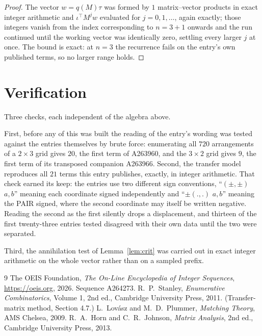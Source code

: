 \documentclass[11pt,a4paper]{article}
\theoremstyle{plain}
\theoremstyle{definition}
\begin{document}
\begin{proof}
The vector $w=q(M)\tau$ was formed by $1$ matrix--vector products in exact integer
arithmetic and $\iota^{\!\top}M^{j}w$ evaluated for $j=0,1,\dots$, again exactly; those
integers vanish from the index corresponding to $n=3+1$ onwards and the run continued
until the working vector was identically zero, settling every larger $j$ at once. The bound is exact: at $n=3$ the recurrence fails on the entry's own published terms, so no larger range holds.
\end{proof}

\section{Verification}

Three checks, each independent of the algebra above.

First, before any of this was built the reading of the entry's wording was tested against the
entries themselves by brute force: enumerating all $720$ arrangements of a $2\times3$ grid
gives $20$, the first term of A263960, and the $3\times2$ grid gives $9$, the first term of its
transposed companion A263966. Second, the transfer model reproduces all $21$ terms this
entry publishes, exactly, in integer arithmetic. That check earned its keep: the entries use
two different sign conventions, ``$(\pm,\pm)$ $a,b$'' meaning each coordinate signed
independently and ``$\pm(.,.)$ $a,b$'' meaning the PAIR signed, where the second coordinate may
itself be written negative. Reading the second as the first silently drops a displacement, and
thirteen of the first twenty-three entries tested disagreed with their own data until the two
were separated.

Third, the annihilation test of Lemma~\ref{lem:crit} was carried out in exact integer
arithmetic on the whole vector rather than on a sampled prefix.

\begin{thebibliography}{9}
 The OEIS Foundation, \emph{The On-Line Encyclopedia of Integer
Sequences}, \url{https://oeis.org}, 2026. Sequence A264273.
 R.~P.~Stanley, \emph{Enumerative Combinatorics}, Volume 1, 2nd ed.,
Cambridge University Press, 2011. (Transfer-matrix method, Section 4.7.)
 L.~Lov\'asz and M.~D.~Plummer, \emph{Matching Theory}, AMS Chelsea, 2009.
 R.~A.~Horn and C.~R.~Johnson, \emph{Matrix Analysis}, 2nd ed., Cambridge
University Press, 2013.
\end{thebibliography}
\end{document}

